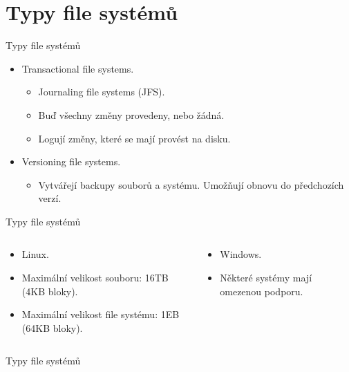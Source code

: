 \documentclass[aspectratio=169,xcolor=dvipsnames, t]{beamer}
\begin{document}
{\section{Typy file systémů}
\begin{frame}{Typy file systémů}
\begin{itemize}
    \item Transactional file systems.
    \begin{itemize}
    \item Journaling file systems (JFS).
    \item Buď všechny změny provedeny, nebo žádná.
    \item Logují změny, které se mají provést na disku.
    \end{itemize}
    \item Versioning file systems.
    \begin{itemize}
    \item Vytvářejí backupy souborů a systému. Umožňují obnovu do předchozích verzí.
    \end{itemize}
\end{itemize}
\end{frame}
\begin{frame}{Typy file systémů}
    \begin{columns}
    \begin{column}{0.45\textwidth}
        \begin{itemize}
            \item Linux.
            \item Maximální velikost souboru: 16TB (4KB bloky).
            \item Maximální velikost file systému: 1EB (64KB bloky).
        \end{itemize}
    \end{column}
    \begin{column}{0.45\textwidth}  %
        \begin{itemize}
            \item Windows.
            \item Některé systémy mají omezenou podporu.
        \end{itemize}
    \end{column}
    \end{columns}
\end{frame}
\begin{frame}{Typy file systémů}
    \begin{columns}

\end{columns}
\end{frame}}
\end{document}
